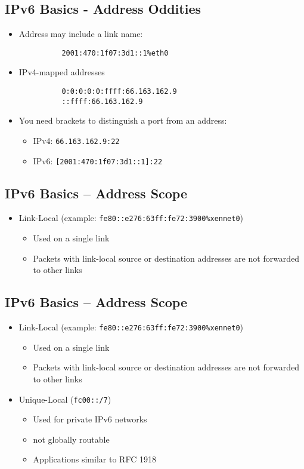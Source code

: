 \documentclass[xga]{xdvislides}
\begin{document}
\subsection{IPv6 Basics - Address Oddities}
\begin{itemize}
	\item Address may include a link name:
\begin{verbatim}
          2001:470:1f07:3d1::1%eth0
\end{verbatim}
	\item IPv4-mapped addresses
\begin{verbatim}
          0:0:0:0:0:ffff:66.163.162.9
          ::ffff:66.163.162.9
\end{verbatim}
	\item You need brackets to distinguish a port from an address:
		\begin{itemize}
			\item IPv4: \verb+66.163.162.9:22+
			\item IPv6: \verb+[2001:470:1f07:3d1::1]:22+
		\end{itemize}
\end{itemize}

\subsection{IPv6 Basics -- Address Scope}
\begin{itemize}
	\item Link-Local (example: \verb+fe80::e276:63ff:fe72:3900%xennet0+)
		\begin{itemize}
			\item Used on a single link
			\item Packets with link-local source or destination addresses are not
				forwarded to other links
		\end{itemize}
\end{itemize}

\subsection{IPv6 Basics -- Address Scope}
\begin{itemize}
	\item Link-Local (example: \verb+fe80::e276:63ff:fe72:3900%xennet0+)
		\begin{itemize}
			\item Used on a single link
			\item Packets with link-local source or destination addresses are not
				forwarded to other links
		\end{itemize}
	\item Unique-Local (\verb+fc00::/7+)
		\begin{itemize}
			\item Used for private IPv6 networks
			\item not globally routable
			\item Applications similar to RFC 1918
		\end{itemize}
\end{itemize}
\end{document}
